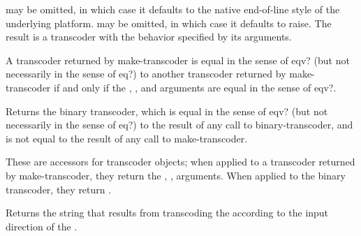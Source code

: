 \begin{entry}{%
}

   may be omitted, in
which case it defaults to the native end-of-line style of the
underlying platform.   may be omitted, in which
case it defaults to {\cf raise}.  The result is a transcoder with the
behavior specified by its arguments.

A transcoder returned by {\cf make-transcoder} is equal in the sense
of {\cf eqv?} (but not necessarily in the sense of {\cf eq?})
to another transcoder returned by {\cf
  make-transcoder} if and only if the , ,
and  arguments are equal in the sense of {\cf
  eqv?}.
\end{entry}

\begin{entry}{%
}

Returns the binary transcoder, which is equal in the sense of
{\cf eqv?} (but not necessarily in the sense of {\cf eq?}) to
the result of any call to {\cf binary-transcoder}, and
is not equal to the result of any call to {\cf make-transcoder}.
\end{entry}

\begin{entry}{%
}

These are accessors for transcoder objects; when applied to a
transcoder returned by {\cf make-transcoder}, they return the
, ,  arguments.
When applied to the binary transcoder, they return \schfalse{}.
\end{entry}

\begin{entry}{%
}

Returns the string that results from transcoding the
 according to the input direction of
the .
\end{entry}

